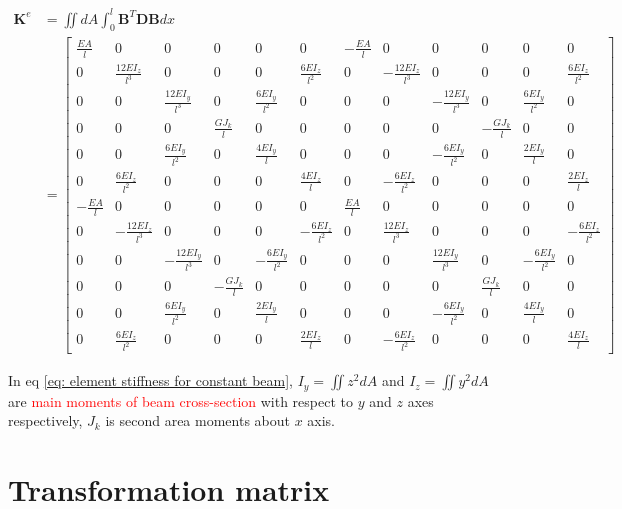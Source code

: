 \begin{equation} \label{eq: element stiffness for constant beam}
\begin{split}
\mathbf{K}^e &= \iint dA \int_{0}^{l} \mathbf{B}^T \mathbf{DB} dx \\
&= \begin{bmatrix}
\frac{EA}{l} & 0 & 0 & 0 & 0 & 0 & -\frac{EA}{l} & 0 & 0 & 0 & 0 & 0 \\ 
0 & \frac{12 E I_z}{l^3} & 0 & 0 & 0 & \frac{6 E I_z}{l^2} & 0 & -\frac{12 E I_z}{l^3} & 0 & 0 & 0 & \frac{6 E I_z}{l^2} \\ 
0 & 0 & \frac{12 E I_y}{l^3} & 0 & \frac{6 E I_y}{l^2} & 0 & 0 & 0 & -\frac{12 E I_y}{l^3} & 0 & \frac{6 E I_y}{l^2} & 0 \\ 
0 & 0 & 0 & \frac{G J_k}{l} & 0 & 0 & 0 & 0 & 0 & -\frac{G J_k}{l} & 0 & 0 \\ 
0 & 0 & \frac{6 E I_y}{l^2} & 0 & \frac{4 E I_y}{l} & 0 & 0 & 0 & -\frac{6 E I_y}{l^2} & 0 & \frac{2 E I_y}{l} & 0 \\ 
0 & \frac{6 E I_z}{l^2} & 0 & 0 & 0 & \frac{4 E I_z}{l} & 0 & -\frac{6 E I_z}{l^2} & 0 & 0 & 0 & \frac{2 E I_z}{l} \\ 
-\frac{EA}{l} & 0 & 0 & 0 & 0 & 0 & \frac{E A}{l} & 0 & 0 & 0 & 0 & 0 \\ 
0 & -\frac{12 E I_z}{l^3} & 0 & 0 & 0 & -\frac{6 E I_z}{l^2} & 0 & \frac{12 E I_z}{l^3} & 0 & 0 & 0 & -\frac{6 E I_z}{l^2} \\ 
0 & 0 & -\frac{12 E I_y}{l^3} & 0 & -\frac{6 E I_y}{l^2} & 0 & 0 & 0 & \frac{12 E I_y}{l^3} & 0 & -\frac{6 E I_y}{l^2} & 0 \\ 
0 & 0 & 0 & -\frac{G J_k}{l} & 0 & 0 & 0 & 0 & 0 & \frac{G J_k}{l} & 0 & 0 \\ 
0 & 0 & \frac{6 E I_y}{l^2} & 0 & \frac{2 E I_y}{l} & 0 & 0 & 0 & -\frac{6 E I_y}{l^2} & 0 & \frac{4 E I_y}{l} & 0 \\ 
0 & \frac{6 E I_z}{l^2} & 0 & 0 & 0 & \frac{2 E I_z}{l} & 0 & -\frac{6 E I_z}{l^2} & 0 & 0 & 0 & \frac{4 E I_z}{l}
\end{bmatrix} 
\end{split}
\end{equation} 

In eq \ref{eq: element stiffness for constant beam}, $ I_y = \iint z^2 dA $ and $ I_z = \iint y^2 dA $ are \textcolor{red}{main moments of beam cross-section} with respect to $ y $ and $ z $ axes respectively, $ J_k $ is second area moments about $ x $ axis.

\section{Transformation matrix}

